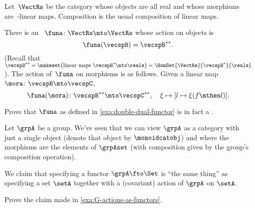\begin{example}
    \label{exa:double-dual-functor}
    Let~$\VectRs$ be the category whose objects are all real  and whose morphisms are~\reals-linear maps.
    Composition is the usual composition of linear maps.

    There is an ~$\funa \colon \VectRs \mto \VectRs$ whose action on objects is
    \begin{equation}
        \funa ( \vecspB ) = \vecspB^{**}.
    \end{equation}
    (Recall that~$\vecspB^{**} = \makeset{ \text{linear maps } \vecspB^* \mto \reals } =  \HomSet{\VectRs}{\vecspB^*}{\reals}$).
    The action of~$\funa$ on morphisms is as follows.
    Given a linear map~$\mora \colon \vecspB \mto \vecspC$,
    \begin{equation}
        \funa ( \mora ) \colon \vecspB^{**} \mto \vecspC^{**}, \quad \xi \mapsto [ l \mapsto \xi (f \mthen l)].
    \end{equation}
\end{example}

\begin{gradedexercise}
    \label{ex:DoubleDualFunctor}
    Prove that $\funa$ as defined in \cref{exa:double-dual-functor} is in fact a .
\end{gradedexercise}


\begin{example}\label{exa:G-actions-as-functors}
   Let $\grpA$ be a group. We've seen that we can view $\grpA$ as a category with just a single object (denote that object by $\monoidcatobj$) and where the morphisms are the elements of $\grpAset$ (with composition given by the group's composition operation).
   
   We claim that specifying a functor $\grpA \fto \Set$ is ``the same thing'' as specifying a set $\setA$ together with a (covariant) action of $\grpA$ on $\setA$. 
\end{example}

\begin{exercise}
Prove the claim made in \cref{exa:G-actions-as-functors}. 
\end{exercise}
\begin{solution}
\end{solution}


% 

